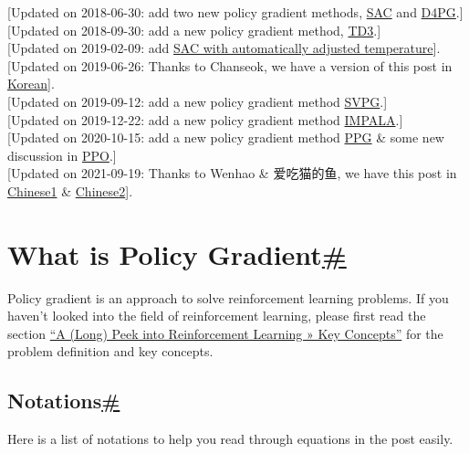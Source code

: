 {{[}Updated on 2018-06-30: add two new policy gradient methods, \hyperref[sac]{SAC} and \hyperref[d4pg]{D4PG}.{]}}\\
{{[}Updated on 2018-09-30: add a new policy gradient method, \hyperref[td3]{TD3}.{]}}\\
{{[}Updated on 2019-02-09: add \hyperref[sac-with-automatically-adjusted-temperature]{SAC with automatically adjusted temperature}{]}.}\\
{{[}Updated on 2019-06-26: Thanks to Chanseok, we have a version of this post in \href{https://talkingaboutme.tistory.com/entry/RL-Policy-Gradient-Algorithms}{Korean}{]}.}\\
{{[}Updated on 2019-09-12: add a new policy gradient method \hyperref[svpg]{SVPG}.{]}}\\
{{[}Updated on 2019-12-22: add a new policy gradient method \hyperref[impala]{IMPALA}.{]}}\\
{{[}Updated on 2020-10-15: add a new policy gradient method \hyperref[ppg]{PPG} \& some new discussion in \hyperref[ppo]{PPO}.{]}}\\
{{[}Updated on 2021-09-19: Thanks to Wenhao \& 爱吃猫的鱼, we have this post in \href{https://tomaxent.com/2019/04/14/\%E7\%AD\%96\%E7\%95\%A5\%E6\%A2\%AF\%E5\%BA\%A6\%E6\%96\%B9\%E6\%B3\%95/}{Chinese1} \& \href{https://paperexplained.cn/articles/article/detail/31/}{Chinese2}{]}.}

\section{\texorpdfstring{What is Policy Gradient\hyperref[what-is-policy-gradient]{\#}}{What is Policy Gradient\#}}\label{what-is-policy-gradient}

Policy gradient is an approach to solve reinforcement learning problems. If you haven't looked into the field of reinforcement learning, please first read the section \href{https://lilianweng.github.io/posts/2018-02-19-rl-overview/\#key-concepts}{``A (Long) Peek into Reinforcement Learning » Key Concepts''} for the problem definition and key concepts.

\subsection{\texorpdfstring{Notations\hyperref[notations]{\#}}{Notations\#}}\label{notations}

Here is a list of notations to help you read through equations in the post easily.

